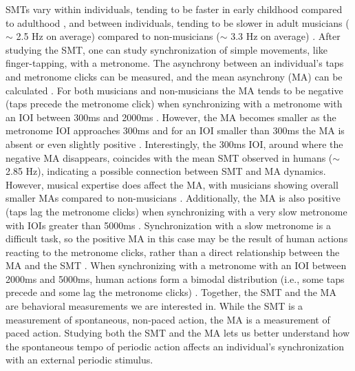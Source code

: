 \documentclass{report}
\begin{document}
SMTs vary within individuals, tending to be faster in early childhood compared to adulthood \cite{mcauley2006time}, and between individuals, tending to be slower in adult musicians ($\sim$ 2.5 Hz on average) compared to non-musicians ($\sim$ 3.3 Hz on average) \cite{scheurich2016spontaneous, drake2000tapping}. After studying the SMT, one can study synchronization of simple movements, like finger-tapping, with a metronome. The asynchrony between an individual's taps and metronome clicks can be measured, and the mean asynchrony (MA) can be calculated \cite{repp2005sensorimotor, repp2013sensorimotor}. For both musicians and non-musicians the MA tends to be negative (taps precede the metronome click) when synchronizing with a metronome with an IOI between 300ms and 2000ms \cite{mates1994temporal}. However, the MA becomes smaller as the metronome IOI approaches 300ms and for an IOI smaller than 300ms the MA is absent or even slightly positive \cite{repp2003rate, wohlschlager1999synchronization}. Interestingly, the 300ms IOI, around where the negative MA disappears, coincides with the mean SMT observed in humans ($\sim$ 2.85 Hz), indicating a possible connection between SMT and MA dynamics. However, musical expertise does affect the MA, with musicians showing overall smaller MAs compared to non-musicians \cite{repp2007tapping}. Additionally, the MA is also positive (taps lag the metronome clicks) when synchronizing with a very slow metronome with IOIs greater than 5000ms \cite{miyake2004two}. Synchronization with a slow metronome is a difficult task, so the positive MA in this case may be the result of human actions reacting to the metronome clicks, rather than a direct relationship between the MA and the SMT \cite{repp2007tapping}. When synchronizing with a metronome with an IOI between 2000ms and 5000ms, human actions form a bimodal distribution (i.e., some taps precede and some lag the metronome clicks) \cite{baaaath2016estimating}. Together, the SMT and the MA are behavioral measurements we are interested in. While the SMT is a measurement of spontaneous, non-paced action, the MA is a measurement of paced action. Studying both the SMT and the MA lets us better understand how the spontaneous tempo of periodic action affects an individual's synchronization with an external periodic stimulus.
\end{document}
